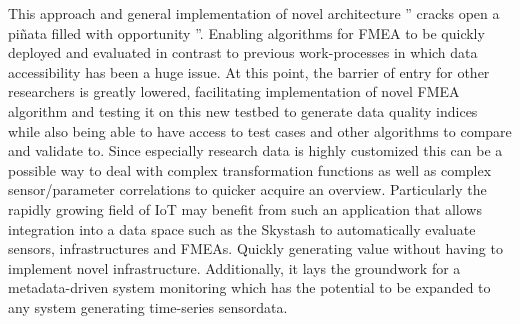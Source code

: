 This approach and general implementation of novel architecture '' cracks open a piñata filled with opportunity ''.\cite{zacharias_what_2023} Enabling algorithms for FMEA to be quickly deployed and evaluated in contrast to previous work-processes in which data accessibility has been a huge issue. At this point, the barrier of entry for other researchers is greatly lowered, facilitating implementation of novel FMEA algorithm and testing it on this new testbed to generate data quality indices while also being able to have access to test cases and other algorithms to compare and validate to. Since especially research data is highly customized this can be a possible way to deal with complex transformation functions as well as complex sensor/parameter correlations to quicker acquire an overview. Particularly the rapidly growing field of IoT may benefit from such an application that allows integration into a data space such as the Skystash to automatically evaluate sensors, infrastructures and FMEAs. Quickly generating value without having to implement novel infrastructure.
Additionally, it lays the groundwork for a metadata-driven system monitoring which has the potential to be expanded to any system generating time-series sensordata.






